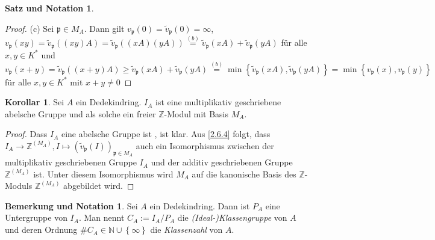 \documentclass[
twoside=semi,
fontsize=12,
DIV=12, 
cleardoublepage=current,
leqno,
headings=optiontoheadandtoc, 
toc=idx
]{scrbook}
\newcommand{\N}{\mathbb{N}}
\newcommand{\Z}{\mathbb{Z}}
\newcommand{\set}[1]{\left\{ #1 \right\}}
\theoremstyle{definition}
\newtheorem{korollar}[definition]{Korollar}
\newtheorem{satz-not}[definition]{Satz und Notation}
\newtheorem{bem-not}[definition]{Bemerkung und Notation}
\begin{document}
\begin{satz-not}
\begin{proof}
 			(c) Sei $\mathfrak{p} \in M_A$. Dann gilt $v_\mathfrak{p}(0) = \tilde{v}_\mathfrak{p}(0) = \infty$, $v_\mathfrak{p}(xy) = \tilde{v}_\mathfrak{p}((xy)A) = \tilde{v}_\mathfrak{p}((xA)(yA)) \overset{(b)}{=} \tilde{v}_\mathfrak{p}(xA) + \tilde{v}_\mathfrak{p}(yA)$ f\"ur alle $x, y\in K^*$ und $v_\mathfrak{p}(x+y) = \tilde{v}_\mathfrak{p}((x+y)A) \geq \tilde{v}_\mathfrak{p}(xA) + \tilde{v}_\mathfrak{p}(yA) \overset{(b)}{=} \min \set{\tilde{v}_\mathfrak{p}(xA), \tilde{v}_\mathfrak{p}(yA)} = \min \set{v_\mathfrak{p}(x), v_\mathfrak{p}(y)}$ f\"ur alle $x,y \in K^*$ mit $x+y\neq 0$
 		\end{proof}
 	\end{satz-not}
 
 	\begin{korollar}\label{2.6.5}
 		Sei $A$ ein Dedekindring. $I_A$ ist eine multiplikativ geschriebene abelsche Gruppe und als solche ein freier $\Z$-Modul mit Basis $M_A$.
 		
 		\begin{proof}
 			Dass $I_A$ eine abelsche Gruppe ist , ist klar. Aus \ref{2.6.4} folgt, dass $I_A \to \Z^{(M_A)}, I \mapsto  (\tilde{v}_\mathfrak{p}(I))_{\mathfrak{p} \in M_A}$ auch ein Isomorphismus zwischen der multiplikativ geschriebenen Gruppe $I_A$ und der additiv geschriebenen Gruppe $\Z^{(M_A)}$ ist. Unter diesem Isomorphismus wird $M_A$ auf die kanonische Basis des $\Z$-Moduls $\Z^{(M_A)}$ abgebildet wird. 
 		\end{proof}
 	\end{korollar}
 
 	\begin{bem-not}\label{2.6.6}
 		Sei $A$ ein Dedekindring. Dann ist $P_A$ eine Untergruppe von $I_A$. Man nennt $C_A := I_A /P_A$ die \emph{(Ideal-)Klassengruppe} von $A$ und deren Ordnung $\#C_A \in \N \cup \set{\infty}$ die \emph{Klassenzahl} von $A$. 
 	\end{bem-not}
 
\end{document}

